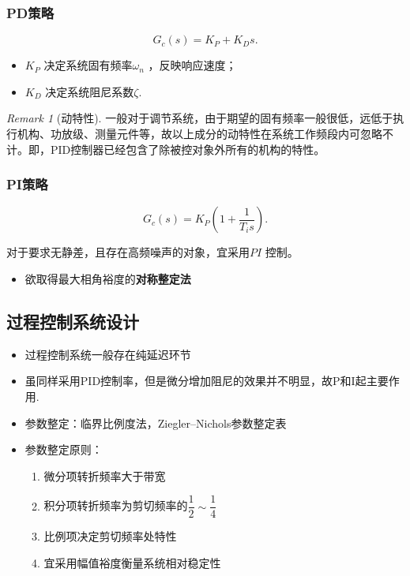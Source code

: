 \documentclass[14pt,a4paper]{article}
\theoremstyle{plain}
\theoremstyle{definition}
\theoremstyle{remark}
\newtheorem{rmk}{Remark}[section]
\theoremstyle{plain}
\theoremstyle{plain}
\theoremstyle{definition}
\begin{document}
			\subsubsection{PD策略}%
			\label{ssub:pd策略}
			
				\[
					G_c(s) = K_P + K_D s
				.\] 

				\begin{itemize}
					\item $K_P$ 决定系统固有频率$\omega_{n}$ ，反映响应速度；
					\item $K_D$ 决定系统阻尼系数$\zeta$. 
				\end{itemize} 
				
				\begin{rmk}[动特性]  
				\label{rmk:动特性}
					一般对于调节系统，由于期望的固有频率一般很低，远低于执行机构、功放级、测量元件等，故以上成分的动特性在系统工作频段内可忽略不计。即，PID控制器已经包含了除被控对象外所有的机构的特性。
				\end{rmk} 

			\subsubsection{PI策略}%
			\label{ssub:pi策略}
			
				\[
					G_c(s) = K_P \left( 1+ \dfrac{1}{T_{i} s} \right)	 
				.\] 

				对于要求无静差，且存在高频噪声的对象，宜采用$PI$ 控制。

				\begin{itemize}
					\item 欲取得最大相角裕度的\textbf{对称整定法} 
				\end{itemize}  

		\subsection{过程控制系统设计}%
		\label{sub:过程控制系统设计}
		
		\begin{itemize}
			\item 过程控制系统一般存在纯延迟环节
			\item 虽同样采用PID控制率，但是微分增加阻尼的效果并不明显，故P和I起主要作用. 
			\item 参数整定：临界比例度法，Ziegler--Nichols参数整定表 
			\item 参数整定原则：
				\begin{enumerate}
					\item 微分项转折频率大于带宽
					\item 积分项转折频率为剪切频率的$\dfrac{1}{2} \sim \dfrac{1}{4}$ 
					\item 比例项决定剪切频率处特性
					\item 宜采用幅值裕度衡量系统相对稳定性
				\end{enumerate} 
		\end{itemize}  
\end{document}
